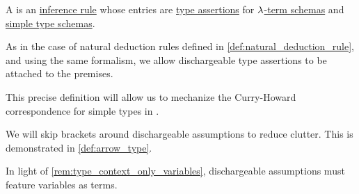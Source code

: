 \begin{definition}\label{def:simple_typing_rule}\mimprovised
  A  is an \hyperref[def:inference_rule]{inference rule} whose entries are \hyperref[def:type_assertion]{type assertions} for \hyperref[def:lambda_term_schema]{\( {\mathrm \lambda} \)-term schemas} and \hyperref[def:simple_type_schema]{simple type schemas}.

  As in the case of natural deduction rules defined in \cref{def:natural_deduction_rule}, and using the same formalism, we allow dischargeable type assertions to be attached to the premises.
\end{definition}
\begin{comments}
  \item This precise definition will allow us to mechanize the Curry-Howard correspondence for simple types in .

  \item We will skip brackets around dischargeable assumptions to reduce clutter. This is demonstrated in \cref{def:arrow_type}.

  \item In light of \cref{rem:type_context_only_variables}, dischargeable assumptions must feature variables as terms.
\end{comments}

